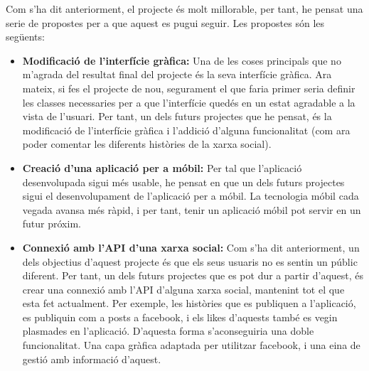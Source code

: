 \documentclass[11pt,catalan,listoffigures,listoftables]{tfgetsinf}
\begin{document}
Com s'ha dit anteriorment, el projecte és molt millorable, per tant, he pensat una serie de propostes per a que aquest es pugui seguir. Les propostes són les següents:
\begin{itemize}
	\item \textbf{Modificació de l'interfície gràfica:} Una de les coses principals que no m'agrada del resultat final del projecte és la seva interfície gràfica. Ara mateix, si fes el projecte de nou, segurament el que faria primer seria definir les classes necessaries per a que l'interfície quedés en un estat agradable a la vista de l'usuari. Per tant, un dels futurs projectes que he pensat, és la modificació de l'interfície gràfica i l'addició d'alguna funcionalitat (com ara poder comentar les diferents històries de la xarxa social).
	\item \textbf{Creació d'una aplicació per a móbil:} Per tal que l'aplicació desenvolupada sigui més usable, he pensat en que un dels futurs projectes sigui el desenvolupament de l'aplicació per a móbil. La tecnologia móbil cada vegada avansa més ràpid, i per tant, tenir un aplicació móbil pot servir en un futur próxim.
	\item \textbf{Connexió amb l'API d'una xarxa social:} Com s'ha dit anteriorment, un dels objectius d'aquest projecte és que els seus usuaris no es sentin un públic diferent. Per tant, un dels futurs projectes que es pot dur a partir d'aquest, és crear una connexió amb l'API d'alguna xarxa social, mantenint tot el que esta fet actualment. Per exemple, les històries que es publiquen a l'aplicació, es publiquin com a posts a facebook, i els likes d'aquests també es vegin plasmades en l'aplicació. D'aquesta forma s'aconseguiria una doble funcionalitat. Una capa gràfica adaptada per utilitzar facebook, i una eina de gestió amb informació d'aquest.
\end{itemize}

\end{document}
